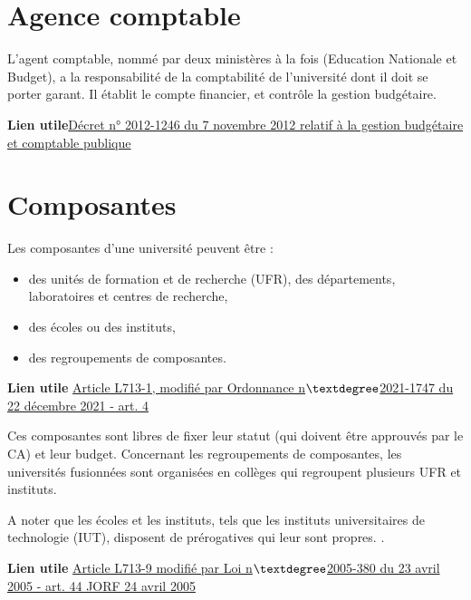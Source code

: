\section{Agence comptable}
L'agent comptable, nomm\'e par deux minist\`eres \`a la fois (Education Nationale et Budget), a la responsabilit\'e de la comptabilit\'e de l'universit\'e dont il doit se porter garant. Il \'etablit le compte financier, et contr\^ole la gestion budg\'etaire.

\textbf{Lien utile\hspace{.5em}}\href{https://www.legifrance.gouv.fr/loda/id/JORFTEXT000026597003}{D\'ecret n° 2012-1246 du 7 novembre 2012 relatif \`a la gestion budg\'etaire et comptable publique}

\section{Composantes}
Les composantes d'une universit\'e peuvent \^etre :
\begin{itemize}
 \item des unit\'es de formation et de recherche (UFR), des d\'epartements, laboratoires et centres de recherche,
 \item des \'ecoles ou des instituts,
 \item des regroupements de composantes.
\end{itemize}
\textbf{Lien utile\hspace{.5em}}
\href{https://www.legifrance.gouv.fr/codes/id/LEGISCTA000006166682}{Article L713-1, modifi\'e par Ordonnance n$\textdegree$2021-1747 du 22 d\'ecembre 2021 - art. 4} 

Ces composantes sont libres de fixer leur statut (qui doivent \^etre approuv\'es par le CA) et leur budget. 
Concernant les regroupements de composantes, les universit\'es fusionn\'ees sont organis\'ees en coll\`eges qui regroupent plusieurs UFR et instituts. 

A noter que les \'ecoles et les instituts, tels que les instituts universitaires de technologie (IUT), 
disposent de pr\'erogatives qui leur sont propres.
.

\textbf{Lien utile\hspace{.5em}}
\href{https://www.legifrance.gouv.fr/codes/id/LEGISCTA000006182446}{Article L713-9 modifi\'e par Loi n$\textdegree$2005-380 du 23 avril 2005 - art. 44 JORF 24 avril 2005}


